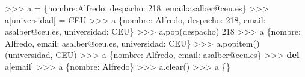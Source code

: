\documentclass[
  spanish,
  a4paper,
]{scrreport}
\newenvironment{Shaded}{\begin{snugshade}}{\end{snugshade}}
\newcommand{\DecValTok}[1]{\textcolor[rgb]{0.68,0.00,0.00}{#1}}
\newcommand{\KeywordTok}[1]{\textcolor[rgb]{0.00,0.23,0.31}{\textbf{#1}}}
\newcommand{\NormalTok}[1]{\textcolor[rgb]{0.00,0.23,0.31}{#1}}
\newcommand{\OperatorTok}[1]{\textcolor[rgb]{0.37,0.37,0.37}{#1}}
\newcommand{\StringTok}[1]{\textcolor[rgb]{0.13,0.47,0.30}{#1}}
\begin{document}
\begin{Shaded}
\begin{Highlighting}[]
\OperatorTok{\textgreater{}\textgreater{}\textgreater{}}\NormalTok{ a }\OperatorTok{=}\NormalTok{ \{}\StringTok{\textquotesingle{}nombre\textquotesingle{}}\NormalTok{:}\StringTok{\textquotesingle{}Alfredo\textquotesingle{}}\NormalTok{, }\StringTok{\textquotesingle{}despacho\textquotesingle{}}\NormalTok{: }\DecValTok{218}\NormalTok{, }\StringTok{\textquotesingle{}email\textquotesingle{}}\NormalTok{:}\StringTok{\textquotesingle{}asalber@ceu.es\textquotesingle{}}\NormalTok{\}}
\OperatorTok{\textgreater{}\textgreater{}\textgreater{}}\NormalTok{ a[}\StringTok{\textquotesingle{}universidad\textquotesingle{}}\NormalTok{] }\OperatorTok{=} \StringTok{\textquotesingle{}CEU\textquotesingle{}}
\OperatorTok{\textgreater{}\textgreater{}\textgreater{}}\NormalTok{ a}
\NormalTok{\{}\StringTok{\textquotesingle{}nombre\textquotesingle{}}\NormalTok{: }\StringTok{\textquotesingle{}Alfredo\textquotesingle{}}\NormalTok{, }\StringTok{\textquotesingle{}despacho\textquotesingle{}}\NormalTok{: }\DecValTok{218}\NormalTok{, }\StringTok{\textquotesingle{}email\textquotesingle{}}\NormalTok{: }\StringTok{\textquotesingle{}asalber@ceu.es\textquotesingle{}}\NormalTok{, }\StringTok{\textquotesingle{}universidad\textquotesingle{}}\NormalTok{: }\StringTok{\textquotesingle{}CEU\textquotesingle{}}\NormalTok{\}}
\OperatorTok{\textgreater{}\textgreater{}\textgreater{}}\NormalTok{ a.pop(}\StringTok{\textquotesingle{}despacho\textquotesingle{}}\NormalTok{)}
\DecValTok{218}
\OperatorTok{\textgreater{}\textgreater{}\textgreater{}}\NormalTok{ a}
\NormalTok{\{}\StringTok{\textquotesingle{}nombre\textquotesingle{}}\NormalTok{: }\StringTok{\textquotesingle{}Alfredo\textquotesingle{}}\NormalTok{, }\StringTok{\textquotesingle{}email\textquotesingle{}}\NormalTok{: }\StringTok{\textquotesingle{}asalber@ceu.es\textquotesingle{}}\NormalTok{, }\StringTok{\textquotesingle{}universidad\textquotesingle{}}\NormalTok{: }\StringTok{\textquotesingle{}CEU\textquotesingle{}}\NormalTok{\}}
\OperatorTok{\textgreater{}\textgreater{}\textgreater{}}\NormalTok{ a.popitem()}
\NormalTok{(}\StringTok{\textquotesingle{}universidad\textquotesingle{}}\NormalTok{, }\StringTok{\textquotesingle{}CEU\textquotesingle{}}\NormalTok{)}
\OperatorTok{\textgreater{}\textgreater{}\textgreater{}}\NormalTok{ a}
\NormalTok{\{}\StringTok{\textquotesingle{}nombre\textquotesingle{}}\NormalTok{: }\StringTok{\textquotesingle{}Alfredo\textquotesingle{}}\NormalTok{, }\StringTok{\textquotesingle{}email\textquotesingle{}}\NormalTok{: }\StringTok{\textquotesingle{}asalber@ceu.es\textquotesingle{}}\NormalTok{\}}
\OperatorTok{\textgreater{}\textgreater{}\textgreater{}} \KeywordTok{del}\NormalTok{ a[}\StringTok{\textquotesingle{}email\textquotesingle{}}\NormalTok{]}
\OperatorTok{\textgreater{}\textgreater{}\textgreater{}}\NormalTok{ a}
\NormalTok{\{}\StringTok{\textquotesingle{}nombre\textquotesingle{}}\NormalTok{: }\StringTok{\textquotesingle{}Alfredo\textquotesingle{}}\NormalTok{\}}
\OperatorTok{\textgreater{}\textgreater{}\textgreater{}}\NormalTok{ a.clear()}
\OperatorTok{\textgreater{}\textgreater{}\textgreater{}}\NormalTok{ a}
\NormalTok{\{\}}
\end{Highlighting}
\end{Shaded}
\end{document}
